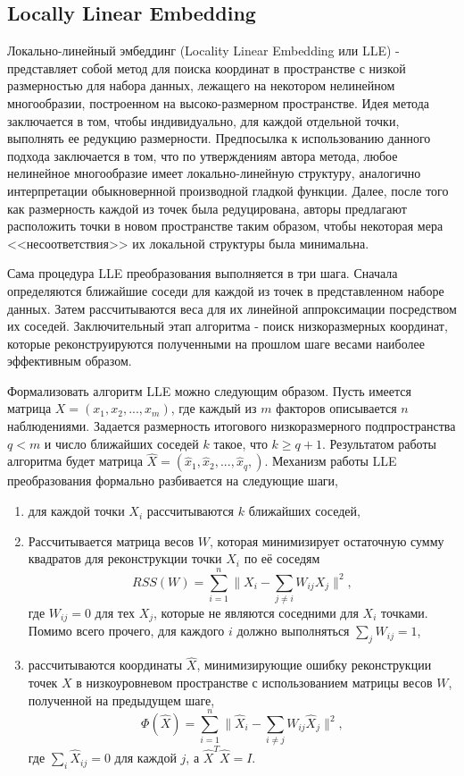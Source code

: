 \documentclass[runningheads]{llncs}
\begin{document}
\subsection{Locally Linear Embedding}
\hspace{0.4cm}
Локально-линейный эмбеддинг (Locality Linear Embedding или LLE) - представляет собой метод для поиска координат в пространстве с низкой размерностью для набора данных, лежащего на некотором нелинейном многообразии, построенном на высоко-размерном пространстве. Идея метода заключается в том, чтобы индивидуально, для каждой отдельной точки, выполнять ее редукцию размерности. Предпосылка к использованию данного подхода заключается в том, что по утверждениям автора метода, любое нелинейное многообразие имеет локально-линейную структуру, аналогично интерпретации обыкновернной производной гладкой функции. Далее, после того как размерность каждой из точек была редуцирована, авторы предлагают расположить точки в новом пространстве таким образом, чтобы некоторая мера <<несоответствия>> их локальной структуры была минимальна. \par

Сама процедура LLE преобразования выполняется в три шага. Сначала определяются ближайшие соседи для каждой из точек в представленном наборе данных. Затем рассчитываются веса для их линейной аппроксимации посредством их соседей. Заключительный этап алгоритма - поиск низкоразмерных координат, которые реконструируются полученными на прошлом шаге весами наиболее эффективным образом. \par
Формализовать алгоритм LLE можно следующим образом. Пусть имеется матрица $X = (x_1, x_2, ..., x_m)$, где каждый из $m$ факторов описывается $n$ наблюдениями. Задается размерность итогового низкоразмерного подпространства $q < m$ и число ближайших соседей $k$ такое, что $k \geq q + 1$. Результатом работы алгоритма будет матрица $\hat{X} = (\hat{x}_1, \hat{x}_2, ..., \hat{x}_q, )$. Механизм работы LLE преобразования формально разбивается на следующие шаги,
\begin{enumerate}
  \item для каждой точки $X_i$ рассчитываются $k$ ближайших соседей,
  \item Рассчитывается матрица весов $W$, которая минимизирует остаточную сумму квадратов для реконструкции точки $X_i$ по её соседям
  $$RSS(W) = \sum_{i=1}^n\|X_i - \sum_{j \neq i}W_{ij}X_j\|^2,$$
  где $W_{ij} = 0$ для тех $X_j$, которые не являются соседними для $X_i$ точками. Помимо всего прочего, для каждого $i$ должно выполняться $\sum_j W_{ij} = 1$,
  \item рассчитываются координаты $\hat{X}$, минимизирующие ошибку реконструкции точек $X$ в низкоуровневом пространстве с использованием матрицы весов $W$, полученной на предыдущем шаге,
  $$\Phi(\hat{X}) = \sum_{i=1}^n\|\hat{X}_i - \sum_{i \neq j} W_{ij}\hat{X}_j\|^2,$$
  где $\sum_i\hat{X}_{ij} = 0$ для каждой $j$, а $\hat{X}^T\hat{X} = I$.
\end{enumerate}
\end{document}
